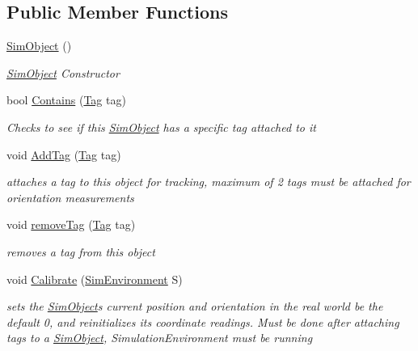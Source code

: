 \subsection*{Public Member Functions}
\begin{DoxyCompactItemize}
\item 
\hyperlink{class_pozyx_positioner_1_1_framework_1_1_sim_object_acc186255ccf8c50a2de3aeaf8e65f645}{Sim\+Object} ()
\begin{DoxyCompactList}\small\item\em \hyperlink{class_pozyx_positioner_1_1_framework_1_1_sim_object}{Sim\+Object} Constructor \end{DoxyCompactList}\item 
bool \hyperlink{class_pozyx_positioner_1_1_framework_1_1_sim_object_a68a000516251ee3062ec72c22cc75f6d}{Contains} (\hyperlink{class_pozyx_positioner_1_1_framework_1_1_tag}{Tag} tag)
\begin{DoxyCompactList}\small\item\em Checks to see if this \hyperlink{class_pozyx_positioner_1_1_framework_1_1_sim_object}{Sim\+Object} has a specific tag attached to it \end{DoxyCompactList}\item 
void \hyperlink{class_pozyx_positioner_1_1_framework_1_1_sim_object_a46185130a7147410af586622732ad64a}{Add\+Tag} (\hyperlink{class_pozyx_positioner_1_1_framework_1_1_tag}{Tag} tag)
\begin{DoxyCompactList}\small\item\em attaches a tag to this object for tracking, maximum of 2 tags must be attached for orientation measurements \end{DoxyCompactList}\item 
void \hyperlink{class_pozyx_positioner_1_1_framework_1_1_sim_object_a7cbe138ef2d7a74045a2e706ae3f59b4}{remove\+Tag} (\hyperlink{class_pozyx_positioner_1_1_framework_1_1_tag}{Tag} tag)
\begin{DoxyCompactList}\small\item\em removes a tag from this object \end{DoxyCompactList}\item 
void \hyperlink{class_pozyx_positioner_1_1_framework_1_1_sim_object_a222891687d37d968292c484b044803ca}{Calibrate} (\hyperlink{class_pozyx_positioner_1_1_framework_1_1_sim_environment}{Sim\+Environment} S)
\begin{DoxyCompactList}\small\item\em sets the \hyperlink{class_pozyx_positioner_1_1_framework_1_1_sim_object}{Sim\+Object}\textquotesingle{}s current position and orientation in the real world be the default 0, and reinitializes its coordinate readings. Must be done after attaching tags to a \hyperlink{class_pozyx_positioner_1_1_framework_1_1_sim_object}{Sim\+Object}, Simulation\+Environment must be running \end{DoxyCompactList}\item 

\end{DoxyCompactItemize}
